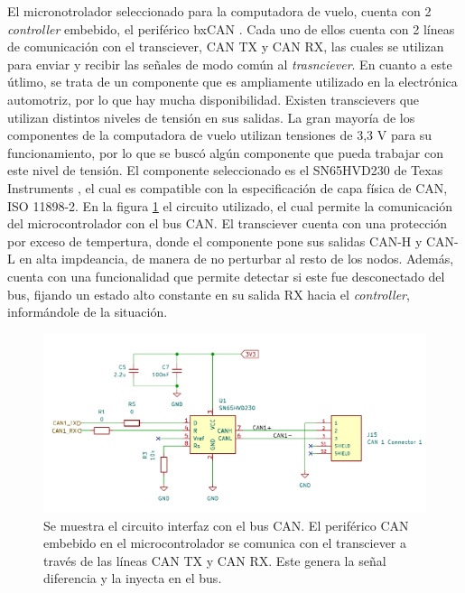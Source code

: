 
El micronotrolador seleccionado para la computadora de vuelo, cuenta con 2 \textit{controller} embebido, el periférico bxCAN \cite{STM32F746ZG}. Cada uno de ellos cuenta con 2 líneas de comunicación con el transciever, CAN TX y CAN RX, las cuales se utilizan para enviar y recibir las señales de modo común al \textit{trasnciever}. En cuanto a este útlimo, se trata de un componente que es ampliamente utilizado en la electrónica automotriz, por lo que hay mucha disponibilidad. Existen transcievers que utilizan distintos niveles de tensión en sus salidas. La gran mayoría de los componentes de la computadora de vuelo utilizan tensiones de 3,3 V para su funcionamiento, por lo que se buscó algún componente que pueda trabajar con este nivel de tensión. El componente seleccionado es el SN65HVD230 de Texas Instruments \cite{SN65VHD230}, el cual es compatible con la especificación de capa física de CAN, ISO 11898-2. En la figura \ref{fig:microcontrolador_transciever} el circuito utilizado, el cual permite la comunicación del microcontrolador con el bus CAN.
El transciever cuenta con una protección por exceso de tempertura, donde el componente pone sus salidas CAN-H y CAN-L en alta impdeancia, de manera de no perturbar al resto de los nodos. Además, cuenta con una funcionalidad que permite detectar si este fue desconectado del bus, fijando un estado alto constante en su salida RX hacia el \textit{controller}, informándole de la situación.

\begin{figure}[htb]
    \centering
    \includegraphics[width=\textwidth]{img/microcontrolador_transciever_circuito.png}    
    \caption{Se muestra el circuito interfaz con el bus CAN. El periférico CAN embebido en el microcontrolador se comunica con el transciever a través de las líneas CAN TX y CAN RX. Este genera la señal diferencia y la inyecta en el bus.}
    \label{fig:microcontrolador_transciever}
\end{figure}

